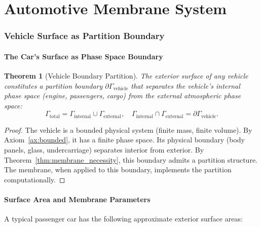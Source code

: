 \documentclass[twocolumn,10pt]{article}
\newtheorem{theorem}{Theorem}[section]
\theoremstyle{definition}
\theoremstyle{remark}
\begin{document}
\part{Automotive Membrane System}
\label{part:automotive}

\section{Vehicle Surface as Partition Boundary}
\label{sec:vehicle_surface}

\subsection{The Car's Surface as Phase Space Boundary}

\begin{theorem}[Vehicle Boundary Partition]
\label{thm:vehicle_boundary}
The exterior surface of any vehicle constitutes a partition boundary $\partial\Gamma_{\mathrm{vehicle}}$ that separates the vehicle's internal phase space (engine, passengers, cargo) from the external atmospheric phase space:
\begin{equation}
  \Gamma_{\mathrm{total}} = \Gamma_{\mathrm{internal}} \cup \Gamma_{\mathrm{external}}, \quad \Gamma_{\mathrm{internal}} \cap \Gamma_{\mathrm{external}} = \partial\Gamma_{\mathrm{vehicle}}.
  \label{eq:vehicle_partition}
\end{equation}
\end{theorem}

\begin{proof}
The vehicle is a bounded physical system (finite mass, finite volume). By Axiom~\ref{ax:bounded}, it has a finite phase space. Its physical boundary (body panels, glass, undercarriage) separates interior from exterior. By Theorem~\ref{thm:membrane_necessity}, this boundary admits a partition structure. The membrane, when applied to this boundary, implements the partition computationally.
\end{proof}

\subsection{Surface Area and Membrane Parameters}

A typical passenger car has the following approximate exterior surface areas:
\end{document}

